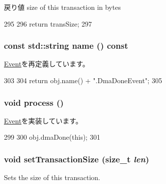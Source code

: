 \begin{DoxyReturn}{戻り値}
size of this transaction in bytes 
\end{DoxyReturn}



\begin{DoxyCode}
295                                           {
296             return transSize;
297         }
\end{DoxyCode}
\hypertarget{classHDLcd_1_1DmaDoneEvent_a6490f765a824ced1cc94979609fe7e07}{
\subsubsection[{name}]{\setlength{\rightskip}{0pt plus 5cm}const std::string name () const}}
\label{classHDLcd_1_1DmaDoneEvent_a6490f765a824ced1cc94979609fe7e07}


\hyperlink{classEvent_adbcff144e5e199d332a1352af1798148}{Event}を再定義しています。


\begin{DoxyCode}
303                                      {
304             return obj.name() + ".DmaDoneEvent";
305         }
\end{DoxyCode}
\hypertarget{classHDLcd_1_1DmaDoneEvent_a2e9c5136d19b1a95fc427e0852deab5c}{
\subsubsection[{process}]{\setlength{\rightskip}{0pt plus 5cm}void process ()}}
\label{classHDLcd_1_1DmaDoneEvent_a2e9c5136d19b1a95fc427e0852deab5c}


\hyperlink{classEvent_a142b75b68a6291400e20fb0dd905b1c8}{Event}を実装しています。


\begin{DoxyCode}
299                        {
300             obj.dmaDone(this);
301         }
\end{DoxyCode}
\hypertarget{classHDLcd_1_1DmaDoneEvent_a12d27d2abd590125ec6c776106e001da}{
\subsubsection[{setTransactionSize}]{\setlength{\rightskip}{0pt plus 5cm}void setTransactionSize (size\_\-t {\em len})}}
\label{classHDLcd_1_1DmaDoneEvent_a12d27d2abd590125ec6c776106e001da}
Sets the size of this transaction.


